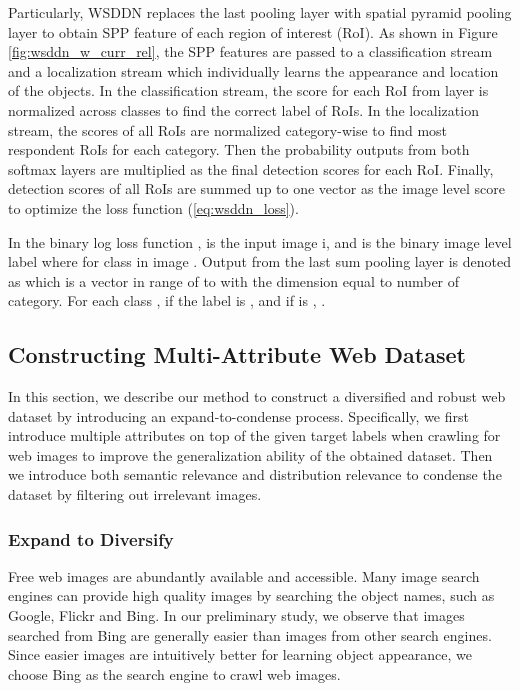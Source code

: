 \documentclass[10pt,twocolumn,letterpaper]{article}
\begin{document}
Particularly, WSDDN replaces the last pooling layer with spatial pyramid pooling layer \cite{lazebnik2006beyond} to obtain SPP feature of each region of interest (RoI). As shown in Figure \ref{fig:wsddn_w_curr_rel}, the SPP features are passed to a classification stream and a localization stream which individually learns the appearance and location of the objects. In the classification stream, the score for each RoI from  layer is normalized across classes to find the correct label of RoIs. In the localization stream, the scores of all RoIs are normalized category-wise to find most respondent RoIs for each category. Then the probability outputs from both softmax layers are multiplied as the final detection scores for each RoI. Finally, detection scores of all RoIs are summed up to one vector as the image level score to optimize the loss function (\ref{eq:wsddn_loss}).



In the binary log loss function  ,  is the input image i, and  is the binary image level label where  for class  in image . Output from the last sum pooling layer is denoted as  which is a vector in range of  to  with the dimension equal to number of category. For each class , if the label  is ,  and if  is , .



\subsection {Constructing Multi-Attribute Web Dataset}
 \label{sec:expand_condense}
In this section, we describe our method to construct a diversified and robust web dataset by introducing an expand-to-condense process. Specifically, we first introduce multiple attributes on top of the given target labels when crawling for web images to improve the generalization ability of the obtained dataset. Then we introduce both semantic relevance and distribution relevance to condense the dataset by filtering out irrelevant images.

\subsubsection{Expand to Diversify}
Free web images are abundantly available and accessible. Many image search engines can provide high quality images by searching the object names, such as Google, Flickr and Bing. In our preliminary study, we observe that images searched from Bing are generally easier than images from other search engines. Since easier images are intuitively better for learning object appearance, we choose Bing as the search engine to crawl web images. 
\end{document}
